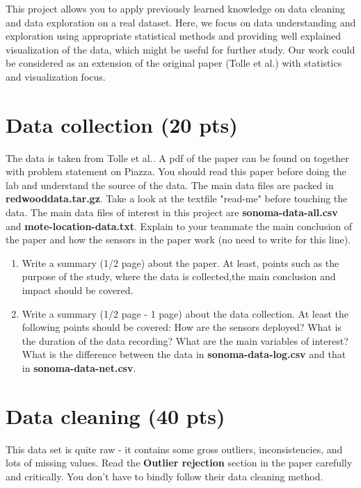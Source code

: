 \documentclass[11pt]{article}
\begin{document}
This project allows you to apply previously learned knowledge on data cleaning and data exploration on a real dataset. Here, we focus on data understanding and exploration using appropriate statistical methods and providing well explained visualization of the data, which might be useful for further study. Our work could be considered as an extension of the original paper (Tolle et al.) with statistics and visualization focus.

\section{Data collection (20 pts)}
The data is taken from Tolle et al.. A pdf of the paper can be found on together with problem statement on Piazza. You should read this paper before doing the lab and understand the source of the data.
The main data files are packed in \textbf{redwooddata.tar.gz}. Take a look at the textfile "read-me" before touching the data. The main data files of interest in this project are \textbf{sonoma-data-all.csv} and \textbf{mote-location-data.txt}.
Explain to your teammate the main conclusion of the paper and how the sensors in the paper work (no need to write for this line). 

\begin{enumerate}[label=(\alph*)]
\item Write a summary (1/2 page) about the paper. At least, points such as the purpose of the study, where the data is collected,the main conclusion and impact should be covered.
\item Write a summary (1/2 page - 1 page) about the data collection. At least the following points should be covered: How are the sensors deployed? What is the duration of the data recording? What are the main variables of interest? What is the difference between the data in \textbf{sonoma-data-log.csv} and that in \textbf{sonoma-data-net.csv}.
\end{enumerate}

\section{Data cleaning (40 pts)}
This data set is quite raw - it contains some gross outliers, inconsistencies, and lots of missing values. Read the \textbf{Outlier rejection} section in the paper carefully and critically. You don't have to bindly follow their data cleaning method.
\end{document}
